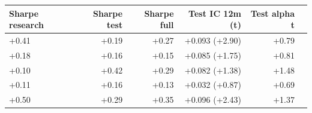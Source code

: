 \begin{tabular}{lrrrrr}
\toprule
Sharpe research & Sharpe test & Sharpe full & Test IC 12m (t) & Test alpha t \\
\midrule
+0.41 & +0.19 & +0.27 & +0.093 (+2.90) & +0.79 \\
+0.18 & +0.16 & +0.15 & +0.085 (+1.75) & +0.81 \\
+0.10 & +0.42 & +0.29 & +0.082 (+1.38) & +1.48 \\
+0.11 & +0.16 & +0.13 & +0.032 (+0.87) & +0.69 \\
+0.50 & +0.29 & +0.35 & +0.096 (+2.43) & +1.37 \\
\bottomrule
\end{tabular}
